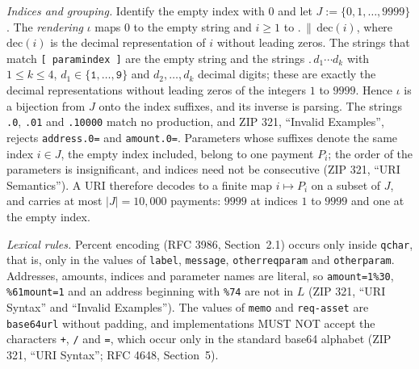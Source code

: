 \documentclass[11pt,a4paper]{article}
\theoremstyle{definition}
\begin{document}
\emph{Indices and grouping.} Identify the empty index with $0$ and let
$J := \{0, 1, \dots, 9999\}$. The \emph{rendering} $\iota$ maps $0$ to the
empty string and $i \ge 1$ to $\texttt{.} \,\|\, \mathrm{dec}(i)$, where
$\mathrm{dec}(i)$ is the decimal representation of $i$ without leading
zeros. The strings that match \texttt{[ paramindex ]} are the empty string
and the strings $\texttt{.}\,d_1 \cdots d_k$ with $1 \le k \le 4$, $d_1 \in
\{\texttt{1}, \dots, \texttt{9}\}$ and $d_2, \dots, d_k$ decimal digits;
these are exactly the decimal representations without leading zeros of the
integers $1$ to $9999$. Hence $\iota$ is a bijection from $J$ onto the
index suffixes, and its inverse is parsing. The strings \texttt{.0},
\texttt{.01} and \texttt{.10000} match no production, and ZIP 321,
``Invalid Examples'', rejects \texttt{address.0=} and \texttt{amount.0=}.
Parameters whose suffixes denote the same index $i \in J$, the empty index
included, belong to one payment $P_i$; the order of the parameters is
insignificant, and indices need not be consecutive (ZIP 321, ``URI
Semantics''). A URI therefore decodes to a finite map $i \mapsto P_i$ on a
subset of $J$, and carries at most $|J| = 10{,}000$ payments: $9999$ at
indices $1$ to $9999$ and one at the empty index.

\emph{Lexical rules.} Percent encoding (RFC 3986, Section~2.1) occurs only
inside \texttt{qchar}, that is, only in the values of \texttt{label},
\texttt{message}, \texttt{otherreqparam} and \texttt{otherparam}.
Addresses, amounts, indices and parameter names are literal, so
\texttt{amount=1\%30}, \texttt{\%61mount=1} and an address beginning with
\texttt{\%74} are not in $L$ (ZIP 321, ``URI Syntax'' and ``Invalid
Examples''). The values of \texttt{memo} and \texttt{req-asset} are
\texttt{base64url} without padding, and implementations MUST NOT accept the
characters \texttt{+}, \texttt{/} and \texttt{=}, which occur only in the
standard base64 alphabet (ZIP 321, ``URI Syntax''; RFC 4648, Section~5).
\end{document}
